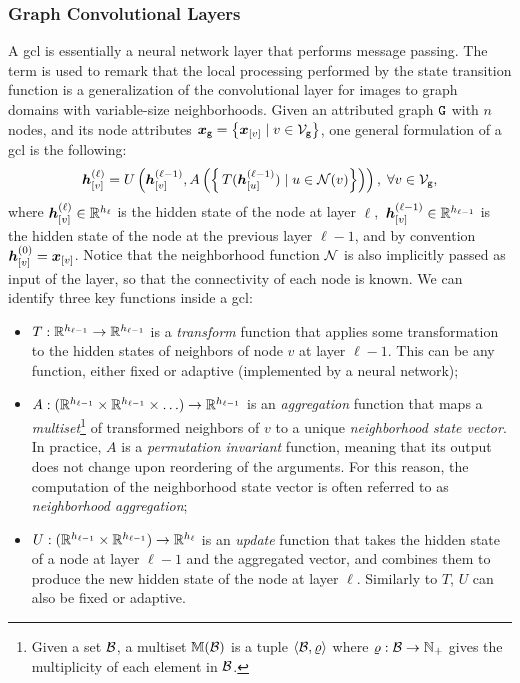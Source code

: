\subsubsection{Graph Convolutional Layers}\label{sec:graph-conv-layers}
A \gls{gcl} is essentially a neural network layer that performs message passing. The term  is used to remark that the local processing performed by the state transition function is a generalization of the convolutional layer for images to graph domains with variable-size neighborhoods. Given an attributed graph $\GraphU{g}$ with $n$ nodes, and its node attributes $\GraphFeatures{x}{g} = \Set{\Elem{x}{v} \mid v \in \Nodes{g}}$, one general formulation of a \gls{gcl} is the following:
\begin{align}
    \label{eq:simple-aggregation}
    \StateVector{v}{\ell} = U \Par{\StateVector{v}{\ell-1}, A\Par{\Set{\,T(\StateVector{u}{\ell-1}) \mid u \in \Neigh(v)}}}, \; \forall v \in \Nodes{g},
\end{align}
where $\StateVector{v}{\ell} \in \Real^{h_\ell}$ is the hidden state of the node at layer $\ell$, $\,\StateVector{v}{\ell-1} \in \Real^{h_{\ell-1}}$ is the hidden state of the node at the previous layer $\ell-1$, and by convention $\StateVector{v}{0} = \Elem{x}{v}$. Notice that the neighborhood function $\Neigh$ is also implicitly passed as input of the layer, so that the connectivity of each node is known. We can identify three key functions inside a \gls{gcl}:
\begin{itemize}
    \item $T: \mathbb{R}^{h_{\ell-1}} \rightarrow \mathbb{R}^{h_{\ell-1}}$ is a \emph{transform} function that applies some transformation to the hidden states of neighbors of node $v$ at layer $\ell-1$. This can be any function, either fixed or adaptive (implemented by a neural network);
    \item $A: (\mathbb{R}^{h_{\ell-1}} \times \mathbb{R}^{h_{\ell-1}} \times \ldots) \rightarrow \mathbb{R}^{h_{\ell-1}}$ is an \emph{aggregation} function that maps a \emph{multiset}\footnote{Given a set $\Cal{B}$, a multiset $\Multiset(\Cal{B})$ is a tuple $\Tuple{\Cal{B}, \varrho}$ where $\varrho: \Cal{B} \shortrightarrow \Natural_+$ gives the multiplicity of each element in $\Cal{B}$.} of transformed neighbors of $v$ to a unique \emph{neighborhood state vector}. In practice, $A$ is a \emph{permutation invariant} function, meaning that its output does not change upon reordering of the arguments. For this reason, the computation of the neighborhood state vector is often referred to as \emph{neighborhood aggregation};
    \item $U: (\mathbb{R}^{h_{\ell-1}} \times \mathbb{R}^{h_{\ell-1}}) \rightarrow \mathbb{R}^{h_{\ell}}$ is an \emph{update} function that takes the hidden state of a node at layer $\ell-1$ and the aggregated vector, and combines them to produce the new hidden state of the node at layer $\ell$. Similarly to $T$, $U$ can also be fixed or adaptive.
\end{itemize}
